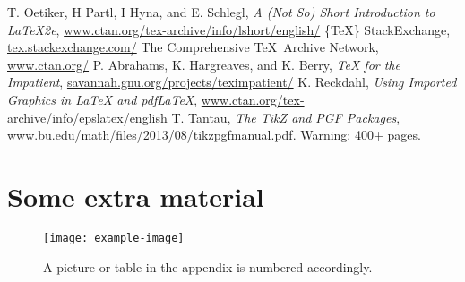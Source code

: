 \documentclass[11pt,twoside]{eitExjobb}
\begin{document}
\begin{thebibliography}{99}
 T. Oetiker, H Partl, I Hyna, and E. Schlegl, \textit{A (Not So) Short Introduction to \LaTeX2e}, \url{www.ctan.org/tex-archive/info/lshort/english/}
 \{\TeX\} StackExchange, \url{tex.stackexchange.com/}
 The Comprehensive \TeX\ Archive Network, \url{www.ctan.org/}
 P. Abrahams, K. Hargreaves, and K. Berry, \textit{TeX for the Impatient}, \url{savannah.gnu.org/projects/teximpatient/}
 K. Reckdahl, \textit{Using Imported Graphics in LaTeX and pdfLaTeX}, \url{www.ctan.org/tex-archive/info/epslatex/english}
 T. Tantau, \textit{The TikZ and PGF Packages}, \url{www.bu.edu/math/files/2013/08/tikzpgfmanual.pdf}. Warning: 400+ pages.
\end{thebibliography}


\appendix
\chapter{Some extra material}
\lipsum[1]
\begin{figure}[htbp]
  \centering
  \texttt{[image: example-image]}
  \caption{A picture or table in the appendix is numbered accordingly.}
  \label{fig:AppFig}
\end{figure}
\end{document}
